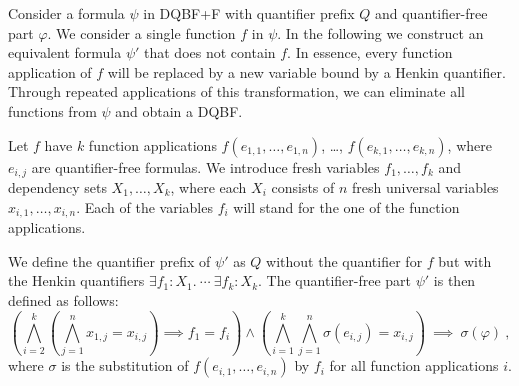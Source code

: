 \documentclass{svjour3}
\newcommand{\ldot}{\mathpunct{.}}
\newcommand{\dep}{\mathit{dep}}
\begin{document}
Consider a formula $\psi$ in DQBF+F with quantifier prefix $Q$ and quantifier-free part $\varphi$.
We consider a single function $f$ in $\psi$.
In the following we construct an equivalent formula $\psi'$ that does not contain $f$.
In essence, every function application of $f$ will be replaced by a new variable bound by a Henkin quantifier.
Through repeated applications of this transformation, we can eliminate all functions from $\psi$ and obtain a DQBF.

%
%
Let $f$ have $k$ function applications $f(e_{1,1},\dots,e_{1,n})$, \dots, $f(e_{k,1},\dots,e_{k,n})$, where $e_{i,j}$ are quantifier-free formulas.
We introduce fresh variables $f_1,\dots,f_k$ and dependency sets $X_1,\dots,X_k$, where each $X_i$ consists of $n$ fresh universal variables $x_{i,1},\dots,x_{i,n}$.
Each of the variables $f_i$ will stand for the one of the function applications.

We define the quantifier prefix of $\psi'$ as $Q$ without the quantifier for $f$ but with the Henkin quantifiers $\exists f_1\colon X_1.~\cdots~\exists f_k \colon X_k$.
The quantifier-free part $\psi'$ is then defined as follows:
\[\left(\bigwedge_{i=2}^k\left(\bigwedge_{j=1}^n x_{1,j} \!=\! x_{i,j}\right)\implies f_1 = f_{i} \right)\wedge \left(\bigwedge_{i=1}^k\bigwedge_{j=1}^n \sigma(e_{i,j}) \!=\! x_{i,j}\right) ~\implies ~\sigma(\varphi)~,\]
%
where $\sigma$ is the substitution of $f(e_{i,1},\dots,e_{i,n})$ by $f_i$ for all function applications $i$.
\end{document}
